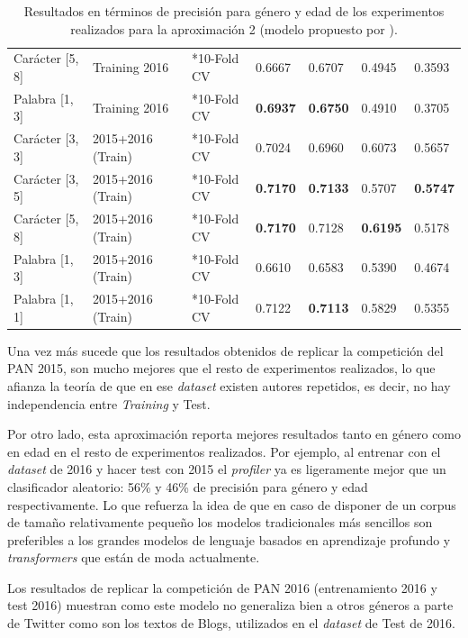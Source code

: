\begin{table}[H]
{\begin{tabular}{|l|ll|ll|ll|}
        Carácter [5, 8] & Training 2016 & *10-Fold CV & 0.6667 & 0.6707 & 0.4945  & 0.3593\\
        Palabra  [1, 3] & Training 2016 & *10-Fold CV & \textbf{0.6937} & \textbf{0.6750} & 0.4910  & 0.3705 \\ \hline
        Carácter [3, 3] & 2015+2016 (Train) & *10-Fold CV & 0.7024 & 0.6960 & 0.6073  & 0.5657 \\
        Carácter [3, 5] & 2015+2016 (Train) & *10-Fold CV & \textbf{0.7170} & \textbf{0.7133} & 0.5707  & \textbf{0.5747} \\
        Carácter [5, 8] & 2015+2016 (Train) & *10-Fold CV & \textbf{0.7170} & 0.7128 & \textbf{0.6195}  & 0.5178 \\
        Palabra  [1, 3] & 2015+2016 (Train) & *10-Fold CV & 0.6610 & 0.6583 & 0.5390  & 0.4674 \\
        Palabra  [1, 1] & 2015+2016 (Train) & *10-Fold CV & 0.7122 & \textbf{0.7113} & 0.5829  & 0.5355 \\\hline
        \end{tabular}%
    }
    \caption{Resultados en términos de precisión para género y edad de los experimentos realizados para la aproximación 2 (modelo propuesto por \citet{grivas2015author}).}
    \label{tab:aprox2_results}
\end{table}

Una vez más sucede que los resultados obtenidos de replicar la competición del PAN 2015, son mucho mejores que el resto de experimentos realizados, lo que afianza la teoría de que en ese \textit{dataset} existen autores repetidos, es decir, no hay independencia entre \textit{Training} y Test.

Por otro lado, esta aproximación reporta mejores resultados tanto en género como en edad en el resto de experimentos realizados. Por ejemplo, al entrenar con el \textit{dataset} de 2016 y hacer test con 2015 el \textit{profiler} ya es ligeramente mejor que un clasificador aleatorio: 56\% y 46\% de precisión para género y edad respectivamente. Lo que refuerza la idea de que en caso de disponer de un corpus de tamaño relativamente pequeño los modelos tradicionales más sencillos son preferibles a los grandes modelos de lenguaje basados en aprendizaje profundo y \textit{transformers} que están de moda actualmente.

Los resultados de replicar la competición de PAN 2016 (entrenamiento 2016 y test 2016) muestran como este modelo no generaliza bien a otros géneros a parte de Twitter como son los textos de Blogs, utilizados en el \textit{dataset} de Test de 2016.

